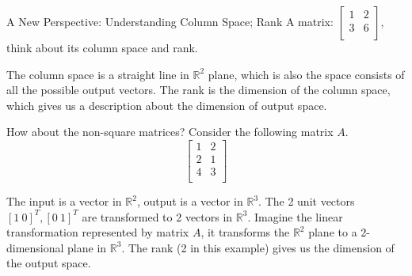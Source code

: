 \documentclass{beamer}
\begin{document}
\begin{frame}{A New Perspective: Understanding Column Space; Rank}
A matrix: $\left[ \begin{matrix}
    1&		2\\
    3&		6\\
\end{matrix} \right]$, think about its column space and rank.

\vspace{3pt}
The column space is a straight line in $\mathbb{R}^2$ plane, which is also the space consists of all the possible output vectors. The rank is the dimension of the column space, which gives us a description about the dimension of output space.

\vspace{3pt}
How about the non-square matrices? Consider the following matrix $A$.
\begin{equation*}
    \left[ \begin{matrix}
        1&		2\\
        2&		1\\
        4&		3\\
    \end{matrix} \right]
\end{equation*}

The input is a vector in $\mathbb{R}^2$, output is a vector in $\mathbb{R}^3$. The 2 unit vectors $[1\:0]^T, [0\:1]^T$ are transformed to 2 vectors in $\mathbb{R}^3$. Imagine the linear transformation represented by matrix $A$, it transforms the $\mathbb{R}^2$ plane to a 2-dimensional plane in $\mathbb{R}^3$. The rank (2 in this example) gives us the dimension of the output space.
\end{frame}
\end{document}
